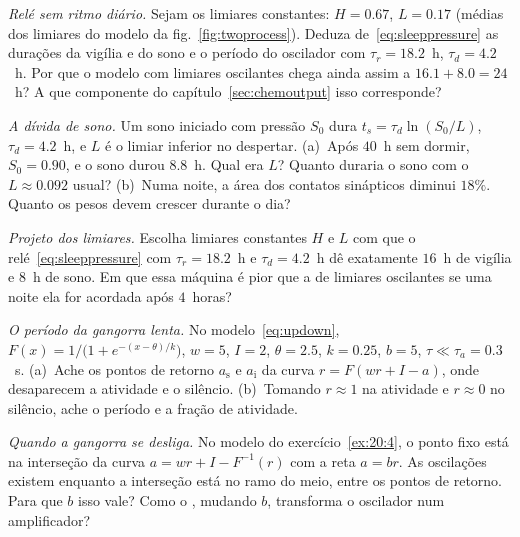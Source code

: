 \begin{exercise}[\lvlA]
\label{ex:20:1}
\emph{Relé sem ritmo diário.} Sejam os limiares constantes: $H=0.67$, $L=0.17$ (médias dos limiares do modelo da fig.~\ref{fig:twoprocess}). Deduza de~\eqref{eq:sleeppressure} as durações da vigília e do sono e o período do oscilador com $\tau_r=18.2$~h, $\tau_d=4.2$~h. Por que o modelo com limiares oscilantes chega ainda assim a $16.1+8.0=24$~h? A que componente do capítulo~\ref{sec:chemoutput} isso corresponde?
\end{exercise}

\begin{exercise}[\lvlA]
\label{ex:20:2}
\emph{A dívida de sono.} Um sono iniciado com pressão $S_0$ dura $t_s=\tau_d\ln(S_0/L)$, $\tau_d=4.2$~h, e $L$ é o limiar inferior no despertar. (a)~Após $40$~h sem dormir, $S_0=0.90$, e o sono durou $8.8$~h. Qual era $L$? Quanto duraria o sono com o $L\approx0.092$ usual? (b)~Numa noite, a área dos contatos sinápticos diminui $18\%$. Quanto os pesos devem crescer durante o dia?
\end{exercise}

\begin{exercise}[\lvlB]
\label{ex:20:3}
\emph{Projeto dos limiares.} Escolha limiares constantes $H$ e $L$ com que o relé~\eqref{eq:sleeppressure} com $\tau_r=18.2$~h e $\tau_d=4.2$~h dê exatamente $16$~h de vigília e $8$~h de sono. Em que essa máquina é pior que a de limiares oscilantes se uma noite ela for acordada após $4$~horas?
\end{exercise}

\begin{exercise}[\lvlB]
\label{ex:20:4}
\emph{O período da gangorra lenta.} No modelo~\eqref{eq:updown}, $F(x)=1/\bigl(1+e^{-(x-\theta)/k}\bigr)$, $w=5$, $I=2$, $\theta=2.5$, $k=0.25$, $b=5$, $\tau\ll\tau_a=0.3$~s. (a)~Ache os pontos de retorno $a_{\text{s}}$ e $a_{\text{i}}$ da curva $r=F(wr+I-a)$, onde desaparecem a atividade e o silêncio. (b)~Tomando $r\approx1$ na atividade e $r\approx0$ no silêncio, ache o período e a fração de atividade.
\end{exercise}

\begin{exercise}[\lvlB]
\label{ex:20:5}
\emph{Quando a gangorra se desliga.} No modelo do exercício~\ref{ex:20:4}, o ponto fixo está na interseção da curva $a=wr+I-F^{-1}(r)$ com a reta $a=br$. As oscilações existem enquanto a interseção está no ramo do meio, entre os pontos de retorno. Para que $b$ isso vale? Como o , mudando $b$, transforma o oscilador num amplificador?
\end{exercise}

